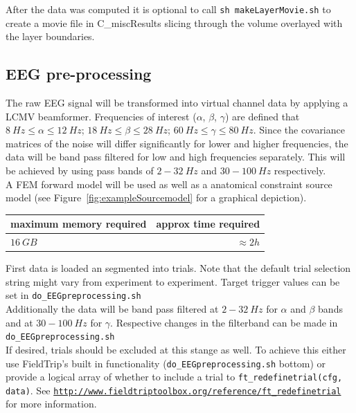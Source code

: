 \documentclass[12pt,a4paper]{scrartcl}
\begin{document}
After the data was computed it is optional to call \texttt{sh makeLayerMovie.sh} to create a movie file in C\_miscResults slicing through the volume overlayed with the layer boundaries.
\FloatBarrier
\subsection{EEG pre-processing}
The raw EEG signal will be transformed into virtual channel data by applying a LCMV beamformer. Frequencies of interest ($\alpha$, $\beta$, $\gamma$) are defined that $8~Hz \leq \alpha \leq 12~Hz$; $18~Hz \leq \beta \leq 28~Hz$; $60~Hz \leq \gamma \leq 80~Hz$. Since the covariance matrices of the noise will differ significantly for lower and higher frequencies, the data will be band pass filtered for low and high frequencies separately. This will be achieved by using pass bands of $2-32~Hz$ and $30-100~Hz$ respectively.\\
A FEM forward model will be used as well as a anatomical constraint source model (see Figure~\ref{fig:exampleSourcemodel} for a graphical depiction).\\
\begin{table}[h]
\begin{tabular}{l | r}
\toprule
maximum memory required & approx time required\\\toprule
$16~GB$ & $\approx 2h$ \\\bottomrule
\end{tabular}
\end{table}
First data is loaded an segmented into trials. Note that the default trial selection string might vary from experiment to experiment. Target trigger values can be set in \texttt{do\_EEGpreprocessing.sh}\\
Additionally the data will be band pass filtered at $2-32~Hz$ for $\alpha$ and $\beta$ bands and at $30-100~Hz$ for $\gamma$. Respective changes in the filterband can be made in \texttt{do\_EEGpreprocessing.sh}\\
If desired, trials should be excluded at this stange as well. To achieve this either use FieldTrip's built in functionality (\texttt{do\_EEGpreprocessing.sh} bottom) or provide a logical array of whether to include a trial to \texttt{ft\_redefinetrial(cfg, data)}. See \href{http://www.fieldtriptoolbox.org/reference/ft_redefinetrial}{\nolinkurl{http://www.fieldtriptoolbox.org/reference/ft\_redefinetrial}} for more information.\\
\end{document}
